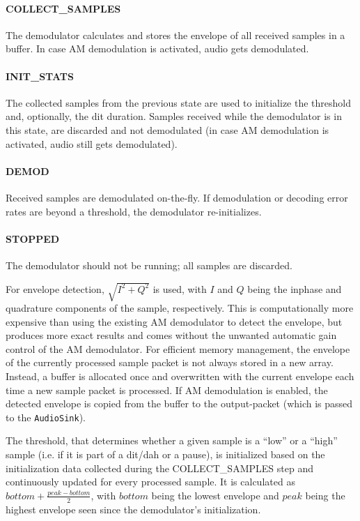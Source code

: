 \paragraph{COLLECT\_{}SAMPLES} The demodulator calculates and stores the envelope of all received samples in a buffer. In case \ac{AM} demodulation is activated, audio gets demodulated.
\paragraph{INIT\_{}STATS} The collected samples from the previous state are used to initialize the threshold and, optionally, the dit duration. Samples received while the demodulator is in this state, are discarded and not demodulated (in case \ac{AM} demodulation is activated, audio still gets demodulated).
\paragraph{DEMOD} Received samples are demodulated on-the-fly. If demodulation or decoding error rates are beyond a threshold, the demodulator re-initializes.
\paragraph{STOPPED} The demodulator should not be running; all samples are discarded.

For envelope detection, $\sqrt{I^{2}+Q^{2}}$ is used, with $I$ and $Q$ being the inphase and quadrature components of the sample, respectively. This is computationally more expensive than using the existing \ac{AM} demodulator to detect the envelope, but produces more exact results and comes without the unwanted automatic gain control of the \ac{AM} demodulator. For efficient memory management, the envelope of the currently processed sample packet is not always stored in a new array. Instead, a buffer is allocated once and overwritten with the current envelope each time a new sample packet is processed. If \ac{AM} demodulation is enabled, the detected envelope is copied from the buffer to the output-packet (which is passed to the \texttt{AudioSink}).

The threshold, that determines whether a given sample is a ``low'' or a ``high'' sample (i.e. if it is part of a dit/dah or a pause), is initialized based on the initialization data collected during the COLLECT\_{}SAMPLES step and continuously updated for every processed sample. It is calculated as $bottom + \frac{peak - bottom}{2}$, with $bottom$ being the lowest envelope and $peak$ being the highest envelope seen since the demodulator's initialization.

